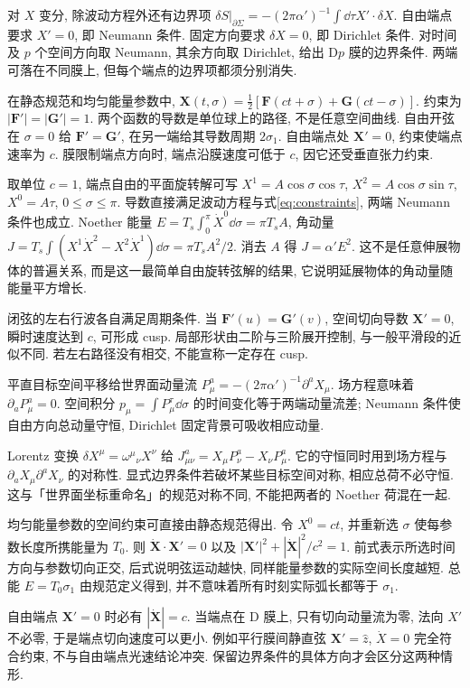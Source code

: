 \label{ch:classical}
对 $X$ 变分, 除波动方程外还有边界项 $\delta S\vert_{\partial\Sigma}=-(2\pi\alpha')^{-1}\int\dd\tau X'\cdot\delta X$. 自由端点要求 $X'=0$, 即 Neumann 条件. 固定方向要求 $\delta X=0$, 即 Dirichlet 条件. 对时间及 $p$ 个空间方向取 Neumann, 其余方向取 Dirichlet, 给出 D$p$ 膜的边界条件. 两端可落在不同膜上, 但每个端点的边界项都须分别消失.

在静态规范和均匀能量参数中, $\boldsymbol X(t,\sigma)=\frac12[\boldsymbol F(ct+\sigma)+\boldsymbol G(ct-\sigma)]$. 约束为 $|\boldsymbol F'|=|\boldsymbol G'|=1$. 两个函数的导数是单位球上的路径, 不是任意空间曲线. 自由开弦在 $\sigma=0$ 给 $\boldsymbol F'=\boldsymbol G'$, 在另一端给其导数周期 $2\sigma_1$. 自由端点处 $\boldsymbol X'=0$, 约束使端点速率为 $c$. 膜限制端点方向时, 端点沿膜速度可低于 $c$, 因它还受垂直张力约束.

取单位 $c=1$, 端点自由的平面旋转解可写 $X^1=A\cos\sigma\cos\tau$, $X^2=A\cos\sigma\sin\tau$, $X^0=A\tau$, $0\le\sigma\le\pi$. 导数直接满足波动方程与式\eqref{eq:constraints}, 两端 Neumann 条件也成立. Noether 能量 $E=T_s\int_0^\pi\dot X^0\dd\sigma=\pi T_sA$, 角动量
$J=T_s\int(X^1\dot X^2-X^2\dot X^1)\dd\sigma=\pi T_sA^2/2$.
消去 $A$ 得 $J=\alpha'E^2$. 这不是任意伸展物体的普遍关系, 而是这一最简单自由旋转弦解的结果, 它说明延展物体的角动量随能量平方增长.

闭弦的左右行波各自满足周期条件. 当 $\boldsymbol F'(u)=\boldsymbol G'(v)$, 空间切向导数 $\boldsymbol X'=0$, 瞬时速度达到 $c$, 可形成 cusp. 局部形状由二阶与三阶展开控制, 与一般平滑段的近似不同. 若左右路径没有相交, 不能宣称一定存在 cusp.

平直目标空间平移给世界面动量流 $P^a_\mu=-(2\pi\alpha')^{-1}\partial^aX_\mu$. 场方程意味着 $\partial_aP^a_\mu=0$. 空间积分 $p_\mu=\int P^\tau_\mu\dd\sigma$ 的时间变化等于两端动量流差; Neumann 条件使自由方向总动量守恒, Dirichlet 固定背景可吸收相应动量.

Lorentz 变换 $\delta X^\mu=\omega^\mu{}_{\nu}X^\nu$ 给 $J^a_{\mu\nu}=X_\mu P^a_\nu-X_\nu P^a_\mu$. 它的守恒同时用到场方程与 $\partial_aX_\mu\partial^aX_\nu$ 的对称性. 显式边界条件若破坏某些目标空间对称, 相应总荷不必守恒. 这与「世界面坐标重命名」的规范对称不同, 不能把两者的 Noether 荷混在一起.

均匀能量参数的空间约束可直接由静态规范得出. 令 $X^0=ct$, 并重新选 $\sigma$ 使每参数长度所携能量为 $T_0$. 则 $\dot{\boldsymbol X}\cdot\boldsymbol X'=0$ 以及 $|\boldsymbol X'|^2+|\dot{\boldsymbol X}|^2/c^2=1$. 前式表示所选时间方向与参数切向正交, 后式说明弦运动越快, 同样能量参数的实际空间长度越短. 总能 $E=T_0\sigma_1$ 由规范定义得到, 并不意味着所有时刻实际弧长都等于 $\sigma_1$.

自由端点 $\boldsymbol X'=0$ 时必有 $|\dot{\boldsymbol X}|=c$. 当端点在 D 膜上, 只有切向动量流为零, 法向 $X'$ 不必零, 于是端点切向速度可以更小. 例如平行膜间静直弦 $\boldsymbol X'=\hat z$, $\dot X=0$ 完全符合约束, 不与自由端点光速结论冲突. 保留边界条件的具体方向才会区分这两种情形.
